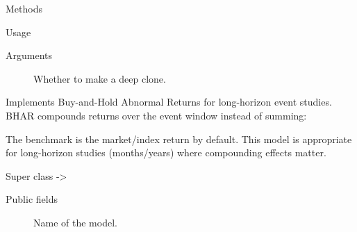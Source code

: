 \documentclass[a4paper]{book}
\begin{document}
\begin{Section}{Methods}
\begin{SubSection}{}
\begin{SubSubSection}{Usage}
\end{SubSubSection}

%
\begin{SubSubSection}{Arguments}

\begin{description}

\item[] Whether to make a deep clone.

\end{description}



\end{SubSubSection}

\end{SubSection}


\end{Section}
%
\begin{Description}
Implements Buy-and-Hold Abnormal Returns for long-horizon event studies.
BHAR compounds returns over the event window instead of summing:

The benchmark is the market/index return by default. This model is
appropriate for long-horizon studies (months/years) where compounding
effects matter.
\end{Description}
%
\begin{Section}{Super class}
 -> 
\end{Section}
%
\begin{Section}{Public fields}

\begin{description}

\item[] Name of the model.

\end{description}


\end{Section}
%
\end{document}
